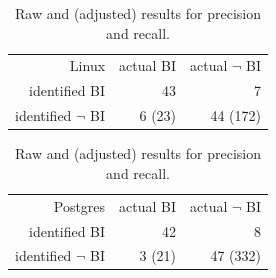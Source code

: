 \begin{table}
\begin{center}
\begin{tabular}{rrr}
Linux & actual BI & actual $\neg$ BI \\
identified BI & 43 & 7 \\
identified $\neg$ BI & 6 (23) & 44 (172) \\
\end{tabular} 

\begin{tabular}{rrr} Postgres & actual BI & actual $\neg$ BI \\
identified BI & 42 & 8 \\
identified $\neg$ BI & 3 (21) & 47 (332)
\end{tabular}
\end{center}
\caption{\label{tab:pr-raw}Raw and (adjusted) results for precision and recall.}

\end{table}


